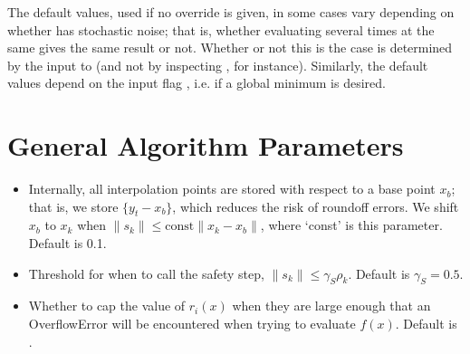 \documentclass[letterpaper,10pt,english]{sphinxmanual}
\begin{document}
The default values, used if no override is given, in some cases vary depending on whether  has stochastic noise; that is, whether evaluating  several times at the same  gives the same result or not. Whether or not this is the case is determined by the  input to  (and not by inspecting , for instance). Similarly, the default values depend on the input flag , i.e. if a global minimum is desired.


\section{General Algorithm Parameters}
\label{\detokenize{advanced:general-algorithm-parameters}}\begin{itemize}
\item {} 
 \sphinxhyphen{} Internally, all interpolation points are stored with respect to a base point \(x_b\); that is, we store \(\{y_t-x_b\}\), which reduces the risk of roundoff errors. We shift \(x_b\) to \(x_k\) when \(\|s_k\| \leq \text{const}\|x_k-x_b\|\), where ‘const’ is this parameter. Default is 0.1.

\item {} 
 \sphinxhyphen{} Threshold for when to call the safety step, \(\|s_k\| \leq \gamma_S \rho_k\). Default is \(\gamma_S =0.5\).

\item {} 
 \sphinxhyphen{} Whether to cap the value of \(r_i(x)\) when they are large enough that an OverflowError will be encountered when trying to evaluate \(f(x)\). Default is .

\end{itemize}
\end{document}
